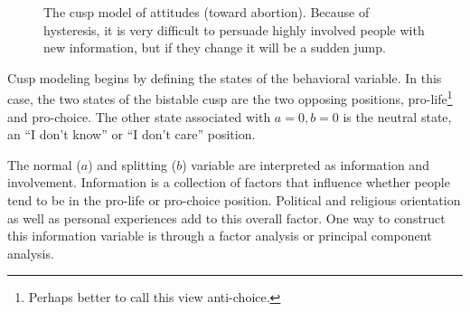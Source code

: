 \documentclass[
  a4paper,
  DIV=11,
  numbers=noendperiod,
  oneside]{scrreprt}
\begin{document}
\begin{figure}


\caption{\label{fig-ch3-img13-old-25}The cusp model of attitudes (toward
abortion). Because of hysteresis, it is very difficult to persuade
highly involved people with new information, but if they change it will
be a sudden jump.}

\end{figure}%

Cusp modeling begins by defining the states of the behavioral variable.
In this case, the two states of the bistable cusp are the two opposing
positions, pro-life\footnote{Perhaps better to call this view
  anti-choice.} and pro-choice. The other state associated with
\(a = 0, b = 0\) is the neutral state, an ``I don't know'' or ``I don't
care'' position.

The normal (\(a\)) and splitting (\(b\)) variable are interpreted as
information and involvement. Information is a collection of factors that
influence whether people tend to be in the pro-life or pro-choice
position. Political and religious orientation as well as personal
experiences add to this overall factor. One way to construct this
information variable is through a factor analysis or principal component
analysis.
\end{document}
